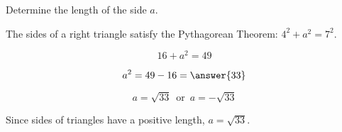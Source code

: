 \documentclass{ximera}
\begin{document}
\begin{example} 




Determine the length of the side $a$. 






\begin{image}[3in]
  \end{image}



\begin{explanation}

The sides of a right triangle satisfy the Pythagorean Theorem: $4^2 + a^2 = 7^2$.


\[  16 + a^2 = 49       \]

\[  a^2 = 49 - 16 = \answer{33}     \]

\[  a = \sqrt{33} \, \text{ or } \, a = -\sqrt{33}    \]



Since sides of triangles have a positive length, $a = \sqrt{33}$.



\end{explanation}




\end{example}
\end{document}
